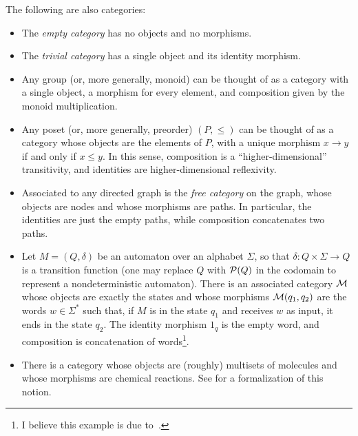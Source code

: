\begin{ex}\label{ex:abstract categories}The following are also categories:
	\begin{itemize}
		\item The \emph{empty category} has no objects and no morphisms.
		\item The \emph{trivial category} has a single object and its identity morphism.
		\item Any group (or, more generally, monoid) can be thought of as a category
		      with a single object, a morphism for every element, and composition
		      given by the monoid multiplication.
		\item Any poset (or, more generally, preorder) $(P, \leq)$ can be thought
		      of as a category whose objects are the elements of $P$, with a unique
		      morphism $x\rightarrow y$ if and only if $x\leq y$. In this sense,
		      composition is a ``higher-dimensional'' transitivity, and identities are
		      higher-dimensional reflexivity.
		\item Associated to any directed graph is the \emph{free category} on the
		      graph, whose objects are nodes and whose morphisms are paths. In
          particular, the identities are just the empty paths, while composition
          concatenates two paths.
    \item Let $M = (Q, \delta)$ be an automaton over an alphabet $\Sigma$, so
          that $\delta: Q\times \Sigma\to Q$ is a transition function (one may
          replace $Q$ with $\mathcal{P}(Q)$ in the codomain to represent a nondeterministic
          automaton). There is an associated category $\mathcal{M}$ whose objects are
          exactly the states and whose morphisms $\mathcal{M}(q_1, q_2)$ are the words
          $w\in\Sigma^*$ such that, if $M$ is in the state $q_1$ and receives $w$ as
          input, it ends in the state $q_2$. The identity morphism $1_q$ is the
          empty word, and composition is concatenation of words\footnote{I believe
          this example is due to~\cite[Example 2.2]{goguen-et-al-1973}.}.
		\item There is a category whose objects are (roughly) multisets of molecules
		      and whose morphisms are chemical reactions. See \cite{baez-2017} for a
		      formalization of this notion.
	\end{itemize}
\end{ex}

